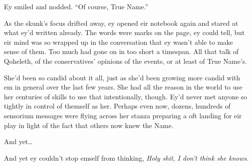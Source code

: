 Ey smiled and nodded. ``Of course, True Name.''

As the skunk's focus drifted away, ey opened eir notebook again and stared at what ey'd written already. The words were marks on the page, ey could tell, but eir mind was so wrapped up in the conversation that ey wasn't able to make sense of them. Too much had gone on in too short a timespan. All that talk of Qoheleth, of the conservatives' opinions of the events, or at least of True Name's.

She'd been so candid about it all, just as she'd been growing more candid with em in general over the last few years. She had all the reason in the world to use her centuries of skills to use that intentionally, though. Ey'd never met anyone so tightly in control of themself as her. Perhaps even now, dozens, hundreds of sensorium messages were flying across her stanza preparing a oft landing for eir play in light of the fact that others now knew the Name.

And yet\ldots{}

And yet ey couldn't stop emself from thinking, \emph{Holy shit, I don't think she knows.}

